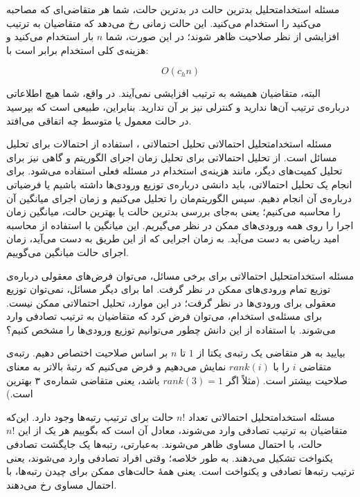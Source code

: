 \begin{itemframe-s}{مسئله استخدام}{تحلیل بدترین حالت}
\itm
در بدترین حالت، شما هر متقاضی‌ای که مصاحبه می‌کنید را استخدام می‌کنید. این حالت زمانی رخ می‌دهد که متقاضیان به ترتیب افزایشی از نظر صلاحیت ظاهر شوند؛ در این صورت، شما $n$ بار استخدام می‌کنید و هزینه‌ی کلی استخدام برابر است با:

$$
O(c_h n)
$$

\itm
البته، متقاضیان همیشه به ترتیب افزایشی نمی‌آیند. در واقع، شما هیچ اطلاعاتی درباره‌ی ترتیب آن‌ها ندارید و کنترلی نیز بر آن ندارید. بنابراین، طبیعی است که بپرسید در حالت معمول یا متوسط چه اتفاقی می‌افتد.
\end{itemframe-s}


\begin{itemframe-s}{مسئله استخدام}{تحلیل احتمالاتی}
\itm
تحلیل احتمالاتی
،
استفاده از احتمالات برای تحلیل مسائل است.
از تحلیل احتمالاتی برای تحلیل زمان اجرای الگوریتم و گاهی نیز برای تحلیل کمیت‌های دیگر، مانند هزینه‌ی استخدام در مسئله فعلی استفاده می‌شود.
\itm
برای انجام یک تحلیل احتمالاتی، باید دانشی درباره‌ی توزیع ورودی‌ها داشته باشیم یا فرضیاتی درباره‌ی آن‌ انجام دهیم.
سپس الگوریتم‌مان را تحلیل می‌کنیم و زمان اجرای میانگین آن را محاسبه می‌کنیم؛ یعنی به‌جای بررسی بدترین حالت یا بهترین حالت، میانگین زمان اجرا را روی همه ورودی‌های ممکن در نظر می‌گیریم. این میانگین با استفاده از محاسبه امید ریاضی به دست می‌آید.
\itm
به زمان اجرایی که از این طریق به دست می‌آید، زمان اجرای حالت میانگین
 می‌گوییم.
\end{itemframe-s}


\begin{itemframe-s}{مسئله استخدام}{تحلیل احتمالاتی}
\itm
برای برخی مسائل، می‌توان فرض‌های معقولی درباره‌ی توزیع تمام ورودی‌های ممکن در نظر گرفت.
اما برای دیگر مسائل، نمی‌توان توزیع معقولی برای ورودی‌ها در نظر گرفت؛ در این موارد، تحلیل احتمالاتی ممکن نیست.
\itm
برای مسئله‌ی استخدام، می‌توان فرض کرد که متقاضیان به ترتیب تصادفی وارد می‌شوند. با استفاده از این دانش چطور می‌توانیم توزیع ورودی‌ها را مشخص کنیم؟

\itm
بیایید به هر متقاضی یک رتبه‌ی یکتا از $1$ تا $n$ بر اساس صلاحیت اختصاص دهیم. رتبه‌ی متقاضی $i$ را با $rank(i)$ نمایش می‌دهیم و فرض می‌کنیم که رتبهٔ بالاتر به معنای صلاحیت بیشتر است. (مثلاً اگر
$rank(3) = 1$
 باشد، یعنی متقاضی شماره‌ی ۳ بهترین است.)

\end{itemframe-s}


\begin{itemframe-s}{مسئله استخدام}{تحلیل احتمالاتی}
\itm
تعداد $n!$ حالت برای ترتیب رتبه‌ها وجود دارد.
این‌که متقاضیان به ترتیب تصادفی وارد می‌شوند، معادل آن است که بگوییم هر یک از این $n!$ حالت، با احتمال مساوی ظاهر می‌شوند.
 به‌عبارتی، رتبه‌ها یک جایگشت تصادفی یکنواخت
 تشکیل می‌دهند.
\itm
به طور خلاصه؛ وقتی افراد تصادفی وارد می‌شوند، یعنی ترتیب رتبه‌ها تصادفی و یکنواخت است. یعنی همهٔ حالت‌های ممکن برای چیدن رتبه‌ها، با احتمال مساوی رخ می‌دهند.
\end{itemframe-s}


